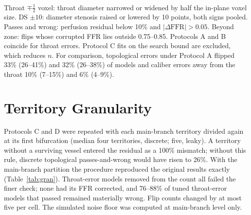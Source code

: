 \documentclass[journal,twoside,web,onecolumn]{ieeecolor}
\begin{document}
\begin{table}[!ht]
\\[3pt]
\parbox{0.95\textwidth}{\footnotesize Throat $\mp\tfrac12$ voxel: throat diameter narrowed or widened by half the in-plane voxel size. DS $\pm10$: diameter stenosis raised or lowered by 10 points, both signs pooled. Passes and wrong: perfusion residual below 10\% and $|\Delta\mathrm{FFR}| > 0.05$. Beyond zone: flips whose corrupted FFR lies outside 0.75--0.85. Protocols A and B coincide for throat errors. Protocol C fits on the search bound are excluded, which reduces $n$. For comparison, topological errors under Protocol A flipped 33\% (26--41\%) and 32\% (26--38\%) of models and caliber errors away from the throat 10\% (7--15\%) and 6\% (4--9\%).}
\end{table}

\FloatBarrier
{}
\section{Territory Granularity}\label{sec:granularity}
Protocols C and D were repeated with each main-branch territory divided again at its first bifurcation (median four territories, discrete; five, leaky). A territory without a surviving vessel entered the residual as a 100\% mismatch; without this rule, discrete topological passes-and-wrong would have risen to 26\%. With the main-branch partition the
procedure reproduced the original results exactly (Table~\ref{tab:gran}). Throat-error models removed from the count
all failed the finer check; none had its FFR corrected, and 76--88\% of tuned throat-error models that passed remained
materially wrong. Flip counts changed by at most five per cell. The simulated noise floor was computed at
main-branch level only.
\end{document}
